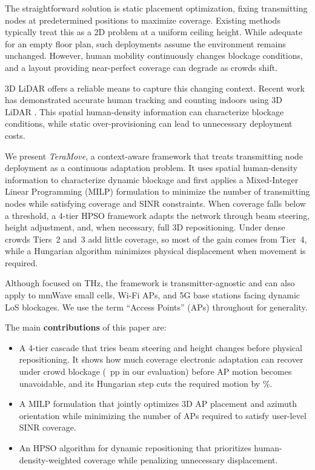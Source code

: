\documentclass[conference]{IEEEtran}
\begin{document}
	The straightforward solution is static placement optimization, fixing transmitting nodes at predetermined positions to maximize coverage. Existing methods typically treat this as a 2D problem at a uniform ceiling height. While adequate for an empty floor plan, such deployments assume the environment remains unchanged. However, human mobility continuously changes blockage conditions, and a layout providing near-perfect coverage can degrade as crowds shift.

	3D LiDAR offers a reliable means to capture this changing context. Recent work has demonstrated accurate human tracking and counting indoors using 3D LiDAR \cite{b27,b29}. This spatial human-density information can characterize blockage conditions, while static over-provisioning can lead to unnecessary deployment costs.

	We present \textit{TeraMove}, a context-aware framework that treats transmitting node deployment as a continuous adaptation problem. It uses spatial human-density information to characterize dynamic blockage and first applies a Mixed-Integer Linear Programming (MILP) formulation to minimize the number of transmitting nodes while satisfying coverage and SINR constraints. When coverage falls below a threshold, a 4-tier HPSO framework adapts the network through beam steering, height adjustment, and, when necessary, full 3D repositioning. Under dense crowds Tiers~2 and~3 add little coverage, so most of the gain comes from Tier~4, while a Hungarian algorithm minimizes physical displacement when movement is required.

	Although focused on THz, the framework is transmitter-agnostic and can also apply to mmWave small cells, Wi-Fi APs, and 5G base stations facing dynamic LoS blockages. We use the term ``Access Points'' (APs) throughout for generality.

	The main \textbf{contributions} of this paper are:
	\begin{itemize}
		\item A 4-tier cascade that tries beam steering and height changes before physical repositioning. It shows how much coverage electronic adaptation can recover under crowd blockage (\TierGainTwoThree~pp in our evaluation) before AP motion becomes unavoidable, and its Hungarian step cuts the required motion by \HungSavingPct\%.

		\item A MILP formulation that jointly optimizes 3D AP placement and azimuth orientation while minimizing the number of APs required to satisfy user-level SINR coverage.

		\item An HPSO algorithm for dynamic repositioning that prioritizes human-density-weighted coverage while penalizing unnecessary displacement.
	\end{itemize}
\end{document}

